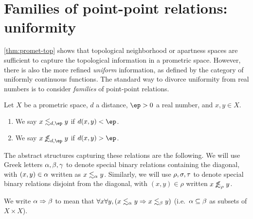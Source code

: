 \documentclass{article}
\def\oapt{\mathrel{\!\not\,\not\lesssim}}
\def\leapx{\lesssim}
\let\implies\Rightarrow
\begin{document}
\section{Families of point-point relations: uniformity}
\label{sec:uniformity}

\cref{thm:promet-top} shows that topological neighborhood or apartness spaces are sufficient to capture the topological information in a prometric space.
However, there is also the more refined \emph{uniform} information, as defined by the category of uniformly continuous functions.
The standard way to divorce uniformity from real numbers is to consider \emph{families} of point-point relations.

\begin{defn}\label{def:pmet-unif}
  Let $X$ be a prometric space, $d$ a distance, $\ep>0$ a real number, and $x,y\in X$.
  \begin{enumerate}
  \item We say $x \leapx_{d,\ep} y$ if $d(x,y)<\ep$.
  \item We say $x \oapt_{d,\ep} y$ if $d(x,y)>\ep$.
  \end{enumerate}
\end{defn}

The abstract structures capturing these relations are the following.
We will use Greek letters $\alpha,\beta,\gamma$ to denote special binary relations containing the diagonal, with $(x,y)\in \alpha$ written as $x\leapx_\al y$.
Similarly, we will use $\rho,\sigma,\tau$ to denote special binary relations disjoint from the diagonal, with $
(x,y)\in\rho$ written $x \oapt_\rho y$.

We write $\al\implies\be$ to mean that $\forall x\forall y,(x\leapx_\al y \implies x\leapx_\be y)$ (i.e.\ $\alpha\subseteq \beta$ as subsets of $X\times X$).
\end{document}
